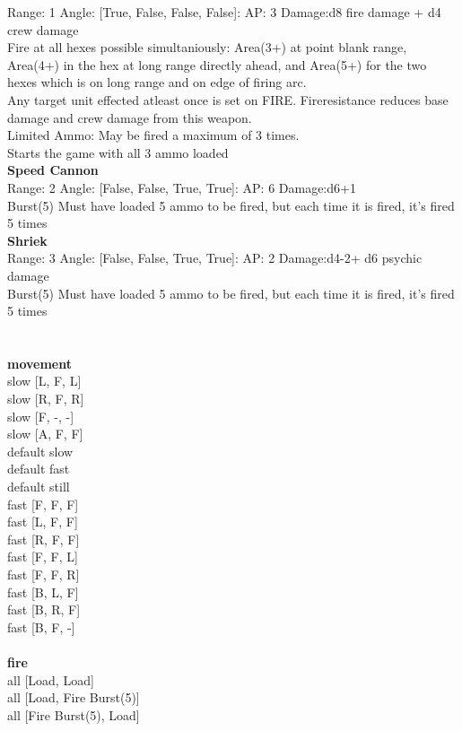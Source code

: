 Range: 1  Angle: [True, False, False, False]: AP: 3 Damage:d8 fire damage + d4 crew damage \\
Fire at all hexes possible simultaniously: Area(3+) at point blank range, Area(4+) in the hex at long range directly ahead, and Area(5+) for the two hexes which is on long range and on edge of firing arc. \\ 
 Any target unit effected atleast once is set on FIRE. Fireresistance reduces base damage and crew damage from this weapon. \\ 
 Limited Ammo: May be fired a maximum of 3 times. \\ 
 Starts the game with all 3 ammo loaded\\ 




{\bf Speed Cannon } \\



Range: 2  Angle: [False, False, True, True]: AP: 6 Damage:d6+1 \\
Burst(5) Must have loaded 5 ammo to be fired, but each time it is fired, it's fired 5 times\\ 




{\bf Shriek } \\



Range: 3  Angle: [False, False, True, True]: AP: 2 Damage:d4-2+ d6 psychic damage \\
Burst(5) Must have loaded 5 ammo to be fired, but each time it is fired, it's fired 5 times\\ 




 
\ \\



\ \\ {\bf movement } \\
slow [L, F, L] \\
slow [R, F, R] \\
slow [F, -, -] \\
slow [A, F, F] \\
default slow \\
default fast \\
default still \\
fast [F, F, F] \\
fast [L, F, F] \\
fast [R, F, F] \\
fast [F, F, L] \\
fast [F, F, R] \\
fast [B, L, F] \\
fast [B, R, F] \\
fast [B, F, -] \\
\ \\ {\bf fire } \\
all [Load, Load] \\
all [Load, Fire Burst(5)] \\
all [Fire Burst(5), Load] \\


